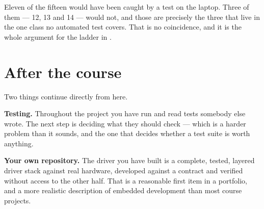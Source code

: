 \begin{aside}
\note Eleven of the fifteen would have been caught by a test on the laptop. Three of them --- 12,
13 and 14 --- would not, and those are precisely the three that live in the one class no automated
test covers. That is no coincidence, and it is the whole argument for the ladder in
.
\end{aside}

\section{After the course}

Two things continue directly from here.

\textbf{Testing.} Throughout the project you have run and read tests somebody else wrote. The next
step is deciding what they should check --- which is a harder problem than it sounds, and the one
that decides whether a test suite is worth anything.

\textbf{Your own repository.} The driver you have built is a complete, tested, layered driver
stack against real hardware, developed against a contract and verified without access to the other
half. That is a reasonable first item in a portfolio, and a more realistic description of embedded
development than most course projects.
